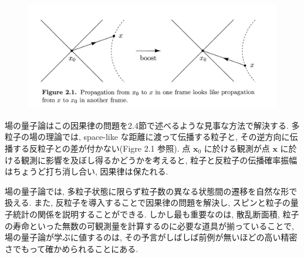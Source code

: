 \documentclass[a4paper,12pt]{article}
\begin{document}
\begin{figure}[H]
  \centering
  \includegraphics[width=1\textwidth]{./PsekinQFT_Sec2-1_fig/fig2-1.png}
\end{figure}

\noindent 場の量子論はこの因果律の問題を2.4節で述べるような見事な方法で解決する. 多粒子の場の理論では, space-like な距離に渡って伝播する粒子と, その逆方向に伝播する反粒子との差が付かない(Figre 2.1 参照). 点 $\boldsymbol{x}_0$ に於ける観測が点 $\boldsymbol{x}$ に於ける観測に影響を及ぼし得るかどうかを考えると, 粒子と反粒子の伝播確率振幅はちょうど打ち消し合い, 因果律は保たれる.
  
場の量子論では, 多粒子状態に限らず粒子数の異なる状態間の遷移を自然な形で扱える. また, 反粒子を導入することで因果律の問題を解決し, スピンと粒子の量子統計の関係を説明することができる. しかし最も重要なのは, 散乱断面積, 粒子の寿命といった無数の可観測量を計算するのに必要な道具が揃っていることで, 場の量子論が学ぶに値するのは, その予言がしばしば前例が無いほどの高い精密さでもって確かめられることにある.
\end{document}
